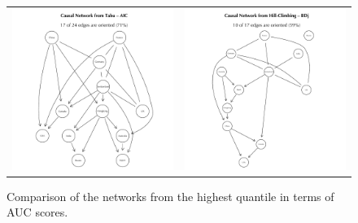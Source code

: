 \documentclass[twoside,twocolumn]{article}
\begin{document}
\begin{figure}[H]
{\begin{tabular}{cc}
 \includegraphics[trim={ 1.5cm  0 1.5cm 0 },clip, width=75mm]{../1. Code/Implied Volatility/Exports/Networks/Causal/Causal5}  &  \includegraphics[trim={ 1.5cm  0 1.5cm 0 },clip, width=75mm]{../1. Code/Implied Volatility/Exports/Networks/Causal/Causal6}\\
 \end{tabular}
}
\caption[Comparison of the impact of the networks with  highest AUC scores]{Comparison of the networks from the highest quantile in terms of AUC scores.}
  \label{fig:causalresults1}
\end{figure}
\newpage
\end{document}
